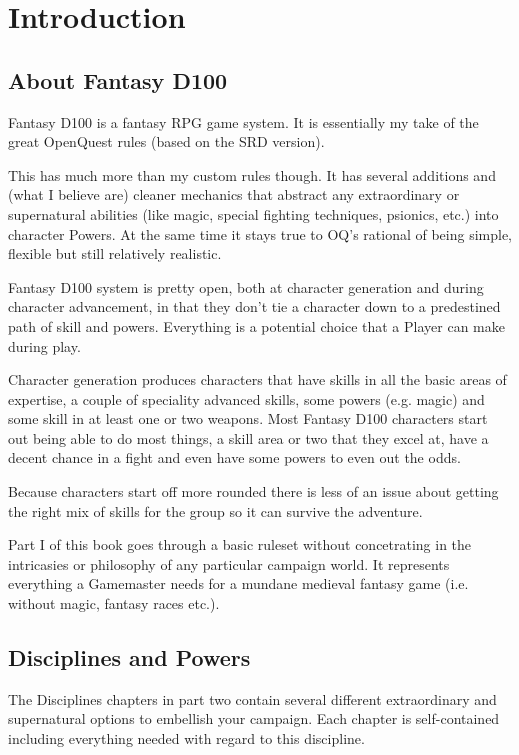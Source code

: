 \chapter{Introduction}
\label{ch:introduction}


\section{About Fantasy D100}

Fantasy D100 is a fantasy RPG game system. It is essentially my take of the great OpenQuest rules (based on the SRD version).

This has much more than my custom rules though. It has several additions and (what I believe are) cleaner mechanics that abstract any extraordinary or supernatural abilities (like magic, special fighting techniques, psionics, etc.) into character Powers. At the same time it stays true to OQ's rational of being simple, flexible but still relatively realistic.

Fantasy D100 system is pretty open, both at character generation and during character advancement, in that they don’t tie a character down to a predestined path of skill and powers. Everything is a potential choice that a Player can make during play.

Character generation produces characters that have skills in all the basic areas of expertise, a couple of speciality advanced skills, some powers (e.g. magic) and some skill in at least one or two weapons. Most Fantasy D100 characters start out being able to do most things, a skill area or two that they excel at, have a decent chance in a fight and even have some powers to even out the odds.

Because characters start off more rounded there is less of an issue about getting the right mix of skills for the group so it can survive the adventure.

Part I of this book goes through a basic ruleset without concetrating in the intricasies or philosophy of any particular campaign world. It represents everything a Gamemaster needs for a mundane medieval fantasy game (i.e. without magic, fantasy races etc.). 


\section{Disciplines and Powers}
The Disciplines chapters in part two contain several different extraordinary and supernatural options to embellish your campaign. Each chapter is self-contained including everything needed with regard to this discipline. 

